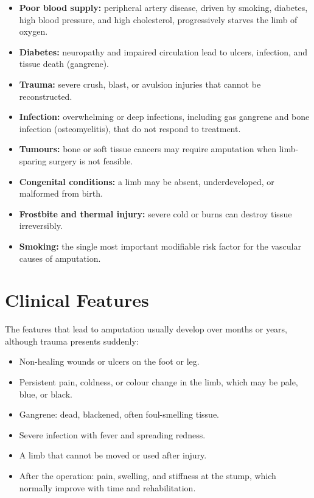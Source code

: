 \begin{itemize}
    \item \textbf{Poor blood supply:} peripheral artery disease, driven by smoking, diabetes, high blood pressure, and high cholesterol, progressively starves the limb of oxygen.
    \item \textbf{Diabetes:} neuropathy and impaired circulation lead to ulcers, infection, and tissue death (gangrene).
    \item \textbf{Trauma:} severe crush, blast, or avulsion injuries that cannot be reconstructed.
    \item \textbf{Infection:} overwhelming or deep infections, including gas gangrene and bone infection (osteomyelitis), that do not respond to treatment.
    \item \textbf{Tumours:} bone or soft tissue cancers may require amputation when limb-sparing surgery is not feasible.
    \item \textbf{Congenital conditions:} a limb may be absent, underdeveloped, or malformed from birth.
    \item \textbf{Frostbite and thermal injury:} severe cold or burns can destroy tissue irreversibly.
    \item \textbf{Smoking:} the single most important modifiable risk factor for the vascular causes of amputation.
\end{itemize}

\section*{Clinical Features}
The features that lead to amputation usually develop over months or years, although trauma presents suddenly:

\begin{itemize}
    \item Non-healing wounds or ulcers on the foot or leg.
    \item Persistent pain, coldness, or colour change in the limb, which may be pale, blue, or black.
    \item Gangrene: dead, blackened, often foul-smelling tissue.
    \item Severe infection with fever and spreading redness.
    \item A limb that cannot be moved or used after injury.
    \item After the operation: pain, swelling, and stiffness at the stump, which normally improve with time and rehabilitation.
\end{itemize}

